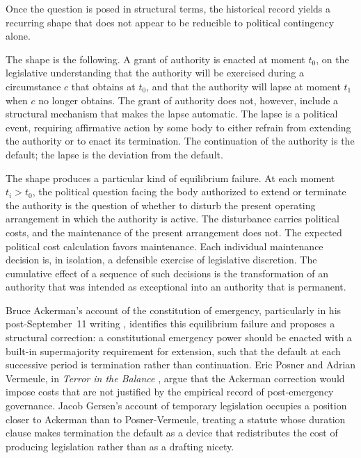 Once the question is posed in structural terms,
the historical record yields a recurring shape that does not appear to be reducible to political contingency alone.

The shape is the following.
A grant of authority is enacted at moment $t_0$,
on the legislative understanding that the authority will be exercised during a circumstance $c$ that obtains at $t_0$,
and that the authority will lapse at moment $t_1$ when $c$ no longer obtains.
The grant of authority does not, however, include a structural mechanism that makes the lapse automatic.
The lapse is a political event, requiring affirmative action by some body
to either refrain from extending the authority or to enact its termination.
The continuation of the authority is the default;
the lapse is the deviation from the default.

The shape produces a particular kind of equilibrium failure.
At each moment $t_i > t_0$, the political question facing the body authorized to extend or terminate
the authority is the question of whether to disturb the present operating arrangement
in which the authority is active.
The disturbance carries political costs, and the maintenance of the present arrangement does not.
The expected political cost calculation favors maintenance.
Each individual maintenance decision is, in isolation, a defensible exercise of legislative discretion.
The cumulative effect of a sequence of such decisions is the transformation of an authority that was
intended as exceptional into an authority that is permanent.

Bruce Ackerman's account of the constitution of emergency, particularly in his post-September~11 writing
\cite{ref_ackerman_before_next_attack},
identifies this equilibrium failure and proposes a structural correction:
a constitutional emergency power should be enacted with a built-in supermajority requirement for extension,
such that the default at each successive period is termination rather than continuation.
Eric Posner and Adrian Vermeule, in \emph{Terror in the Balance} \cite{ref_posner_vermeule_terror},
argue that the Ackerman correction would impose costs that are not justified by the empirical record
of post-emergency governance.
Jacob Gersen's account of temporary legislation \cite{ref_gersen_temporary_legislation} occupies a position closer
to Ackerman than to Posner-Vermeule, treating a statute whose duration clause makes termination the default
as a device that redistributes the cost of producing legislation rather than as a drafting nicety.

